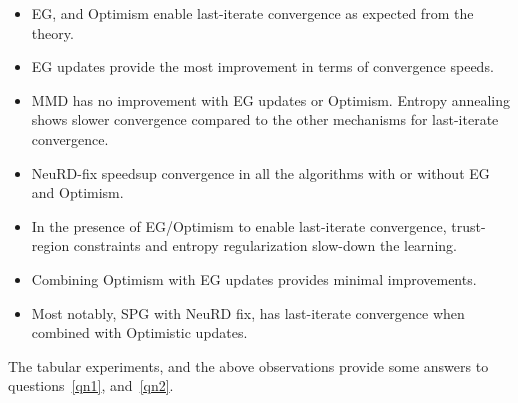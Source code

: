 \begin{itemize}
	\item {EG, and Optimism enable last-iterate convergence as expected from the theory.
	      }
	\item {EG updates provide the most improvement in terms of convergence speeds.}
	\item {MMD has no improvement with EG updates or Optimism.
	      Entropy annealing shows slower convergence compared to the other mechanisms for last-iterate
	      convergence.
	      }
	\item {NeuRD-fix speedsup convergence in all the algorithms with or without EG and Optimism.
	      }
	\item {In the presence of EG/Optimism to enable last-iterate convergence, trust-region constraints and entropy
	      regularization slow-down the learning.}
	\item {Combining Optimism with EG updates provides minimal improvements.
	      }
	\item {Most notably, SPG with NeuRD fix, has last-iterate convergence when combined with Optimistic updates.}
\end{itemize}

The tabular experiments, and the above observations provide some answers to questions~\ref{qn1},
and~\ref{qn2}.
